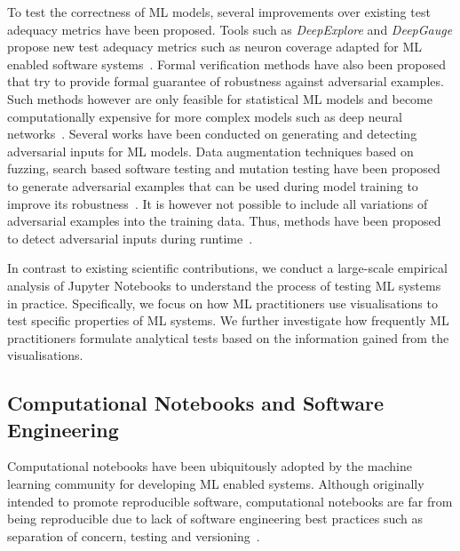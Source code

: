 \documentclass[conference]{IEEEtran}
\begin{document}
To test the correctness of ML models, several improvements over existing test adequacy metrics have been proposed. Tools such as \textit{DeepExplore} and \textit{DeepGauge} propose new test adequacy metrics such as neuron coverage adapted for ML enabled software systems~\cite{pei2017deepexplore, ma2018deepgauge, gerasimou2020importance}. Formal verification methods have also been proposed that try to provide formal guarantee of robustness against adversarial examples. Such methods however are only feasible for statistical ML models and become computationally expensive for more complex models such as deep neural networks~\cite{zhu2021deepmemory, baluta2021scalable}. Several works have been conducted on generating and detecting adversarial inputs for ML models. Data augmentation techniques based on fuzzing, search based software testing and mutation testing have been proposed to generate adversarial examples that can be used during model training to improve its robustness~\cite{braiek2019deepevolution, gao2020fuzz, wang2021robot, zhang2020white}. It is however not possible to include all variations of adversarial examples into the training data. Thus, methods have been proposed to detect adversarial inputs during runtime~\cite{xiao2021self, wang2020dissector, wang2019adversarial, berend2020cats}.

In contrast to existing scientific contributions, we conduct a large-scale empirical analysis of Jupyter Notebooks to understand the process of testing ML systems in practice. Specifically, we focus on how ML practitioners use visualisations to test specific properties of ML systems. We further investigate how frequently ML practitioners formulate analytical tests based on the information gained from the visualisations.

\subsection{Computational Notebooks and Software Engineering}\label{sec:notebooks}

Computational notebooks have been ubiquitously adopted by the machine learning community for developing ML enabled systems. Although originally intended to promote reproducible software, computational notebooks are far from being reproducible due to lack of software engineering best practices such as separation of concern, testing and versioning~\cite{pimentel2019large,wang2020better,chattopadhyay2020wrong}.
\end{document}
